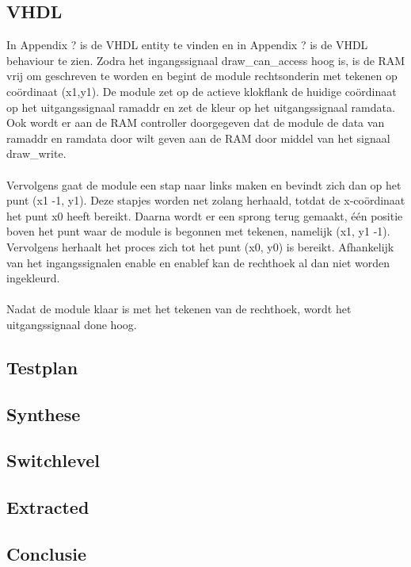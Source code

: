 \documentclass{scrartcl} %
\begin{document}
\subsection{VHDL}
In Appendix ? is de VHDL entity te vinden en in Appendix ? is de VHDL behaviour te zien. Zodra het ingangssignaal draw\_can\_access hoog is, is de RAM vrij om geschreven te worden en begint de module rechtsonderin met tekenen op coördinaat (x1,y1). De module zet op de actieve klokflank de huidige coördinaat op het uitgangssignaal ramaddr en zet de kleur op het uitgangssignaal ramdata. Ook wordt er aan de RAM controller doorgegeven dat de module de data van ramaddr en ramdata door wilt geven aan de RAM door middel van het signaal draw\_write. \\
\\
Vervolgens gaat de module een stap naar links maken en bevindt zich dan op het punt (x1 -1, y1). Deze stapjes worden net zolang herhaald, totdat de x-coördinaat het punt x0 heeft bereikt. Daarna wordt er een sprong terug gemaakt, één positie boven het punt waar de module is begonnen met tekenen, namelijk (x1, y1 -1). Vervolgens herhaalt het proces zich tot het punt (x0, y0) is bereikt. Afhankelijk van het ingangssignalen enable en enablef kan de rechthoek al dan niet worden ingekleurd.\\
\\
Nadat de module klaar is met het tekenen van de rechthoek, wordt het uitgangssignaal done hoog.

\subsection{Testplan}


\subsection{Synthese}


\subsection{Switchlevel}


\subsection{Extracted}

\subsection{Conclusie}
\end{document}
